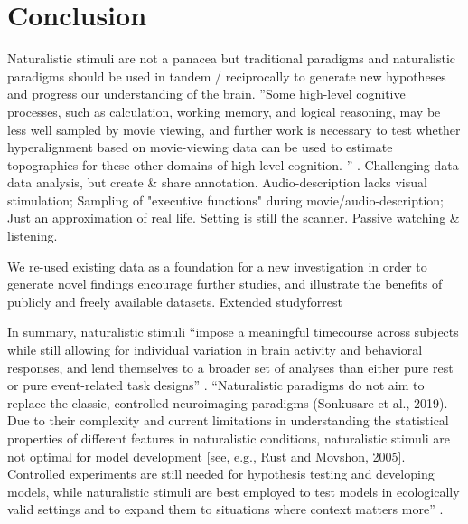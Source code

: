 \section{Conclusion}



%
Naturalistic stimuli are not a panacea but traditional paradigms and
naturalistic paradigms should be used in tandem / reciprocally to generate new
hypotheses and progress our understanding of the brain.
%
''Some high-level cognitive processes, such as calculation, working memory, and
logical reasoning, may be less well sampled by movie viewing, and further work
is necessary to test whether hyperalignment based on movie-viewing data can be
used to estimate topographies for these other domains of high-level cognition.
'' \citep{jiahui2020predicting}.
%
Challenging data data analysis, but create \& share annotation.
%
Audio-description lacks visual stimulation; Sampling of "executive functions"
during movie/audio-description;
%
Just an approximation of real life.
%
Setting is still the scanner.
%
Passive watching \& listening.

%
We re-used existing data as a foundation for a new investigation in
order to generate novel findings encourage further studies, and illustrate the
benefits of publicly and freely available datasets.
%
Extended studyforrest

%
In summary, naturalistic stimuli ``impose a meaningful timecourse across
subjects while still allowing for individual variation in brain activity and
behavioral responses, and lend themselves to a broader set of analyses than
either pure rest or pure event-related task designs'' \citep{finn2017can}.
%
``Naturalistic paradigms do not aim to replace the classic, controlled
neuroimaging paradigms (Sonkusare et al., 2019).
%
Due to their complexity and current limitations in understanding the statistical
properties of different features in naturalistic conditions, naturalistic
stimuli are not optimal for model development [see, e.g., Rust and Movshon,
2005].
%
Controlled experiments are still needed for hypothesis testing and developing
models, while naturalistic stimuli are best employed to test models in
ecologically valid settings and to expand them to situations where context
matters more'' \citep{saarimaki2021naturalistic}.



